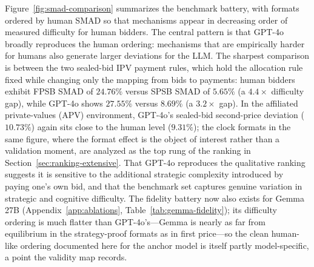Figure~\ref{fig:smad-comparison} summarizes the benchmark battery, with formats ordered by human SMAD so that mechanisms appear in decreasing order of measured difficulty for human bidders. The central pattern is that GPT-4o broadly reproduces the human ordering: mechanisms that are empirically harder for humans also generate larger deviations for the LLM. The sharpest comparison is between the two sealed-bid IPV payment rules, which hold the allocation rule fixed while changing only the mapping from bids to payments: human bidders exhibit FPSB SMAD of $24.76\%$ versus SPSB SMAD of $5.65\%$ (a $4.4\times$ difficulty gap), while GPT-4o shows $27.55\%$ versus $8.69\%$ (a $3.2\times$ gap). In the affiliated private-values (APV) environment, GPT-4o's sealed-bid second-price deviation ($10.73\%$) again sits close to the human level ($9.31\%$); the clock formats in the same figure, where the format effect is the object of interest rather than a validation moment, are analyzed as the top rung of the ranking in Section~\ref{sec:ranking-extensive}. That GPT-4o reproduces the qualitative ranking suggests it is sensitive to the additional strategic complexity introduced by paying one's own bid, and that the benchmark set captures genuine variation in strategic and cognitive difficulty. The fidelity battery now also exists for Gemma 27B (Appendix~\ref{app:ablations}, Table~\ref{tab:gemma-fidelity}); its difficulty ordering is much flatter than GPT-4o's---Gemma is nearly as far from equilibrium in the strategy-proof formats as in first price---so the clean human-like ordering documented here for the anchor model is itself partly model-specific, a point the validity map records.

